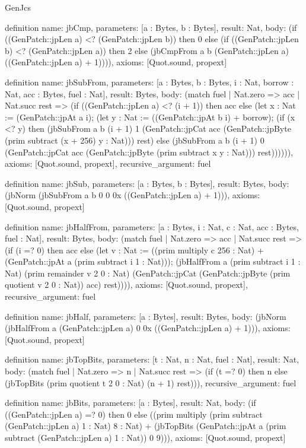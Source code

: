 \begin{lexlean}{GenJcs}
\begin{semanticmodule}
definition{
  name: jbCmp,
  parameters: [a : Bytes, b : Bytes],
  result: Nat,
  body: (if ((GenPatch::jpLen a) <? (GenPatch::jpLen b)) then 0 else (if ((GenPatch::jpLen b) <? (GenPatch::jpLen a)) then 2 else (jbCmpFrom a b (GenPatch::jpLen a) ((GenPatch::jpLen a) + 1)))),
  axioms: [Quot.sound, propext]
}

definition{
  name: jbSubFrom,
  parameters: [a : Bytes, b : Bytes, i : Nat, borrow : Nat, acc : Bytes, fuel : Nat],
  result: Bytes,
  body: (match fuel
    | Nat.zero => acc
    | Nat.succ rest => (if ((GenPatch::jpLen a) <? (i + 1)) then acc else (let x : Nat := (GenPatch::jpAt a i); (let y : Nat := ((GenPatch::jpAt b i) + borrow); (if (x <? y) then (jbSubFrom a b (i + 1) 1 (GenPatch::jpCat acc (GenPatch::jpByte (prim subtract (x + 256) y : Nat))) rest) else (jbSubFrom a b (i + 1) 0 (GenPatch::jpCat acc (GenPatch::jpByte (prim subtract x y : Nat))) rest)))))),
  axioms: [Quot.sound, propext],
  recursive_argument: fuel
}

definition{
  name: jbSub,
  parameters: [a : Bytes, b : Bytes],
  result: Bytes,
  body: (jbNorm (jbSubFrom a b 0 0 0x ((GenPatch::jpLen a) + 1))),
  axioms: [Quot.sound, propext]
}

definition{
  name: jbHalfFrom,
  parameters: [a : Bytes, i : Nat, c : Nat, acc : Bytes, fuel : Nat],
  result: Bytes,
  body: (match fuel
    | Nat.zero => acc
    | Nat.succ rest => (if (i =? 0) then acc else (let v : Nat := ((prim multiply c 256 : Nat) + (GenPatch::jpAt a (prim subtract i 1 : Nat))); (jbHalfFrom a (prim subtract i 1 : Nat) (prim remainder v 2 0 : Nat) (GenPatch::jpCat (GenPatch::jpByte (prim quotient v 2 0 : Nat)) acc) rest)))),
  axioms: [Quot.sound, propext],
  recursive_argument: fuel
}

definition{
  name: jbHalf,
  parameters: [a : Bytes],
  result: Bytes,
  body: (jbNorm (jbHalfFrom a (GenPatch::jpLen a) 0 0x ((GenPatch::jpLen a) + 1))),
  axioms: [Quot.sound, propext]
}

definition{
  name: jbTopBits,
  parameters: [t : Nat, n : Nat, fuel : Nat],
  result: Nat,
  body: (match fuel
    | Nat.zero => n
    | Nat.succ rest => (if (t =? 0) then n else (jbTopBits (prim quotient t 2 0 : Nat) (n + 1) rest))),
  recursive_argument: fuel
}

definition{
  name: jbBits,
  parameters: [a : Bytes],
  result: Nat,
  body: (if ((GenPatch::jpLen a) =? 0) then 0 else ((prim multiply (prim subtract (GenPatch::jpLen a) 1 : Nat) 8 : Nat) + (jbTopBits (GenPatch::jpAt a (prim subtract (GenPatch::jpLen a) 1 : Nat)) 0 9))),
  axioms: [Quot.sound, propext]
}


\end{semanticmodule}
\end{lexlean}
